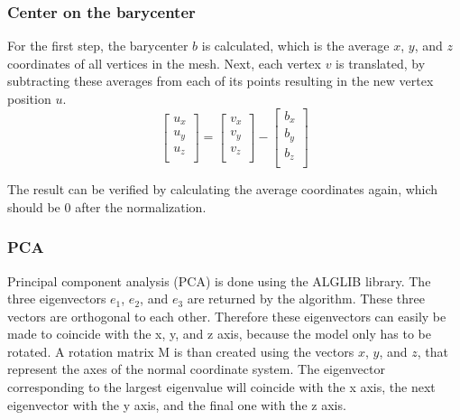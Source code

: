 \documentclass{bigdata}
\begin{document}
\subsubsection{Center on the barycenter}

For the first step, the barycenter $b$ is calculated, which is the average $x$, $y$, and $z$ coordinates of all vertices in the mesh. Next, each vertex $v$ is translated, by subtracting these averages from each of its points resulting in the new vertex position $u$.
\[
\begin{bmatrix}
u_x \\
u_y \\
u_z \\
\end{bmatrix}
=
\begin{bmatrix}
v_x \\
v_y \\
v_z \\
\end{bmatrix}
-
\begin{bmatrix}
b_x \\
b_y \\
b_z \\
\end{bmatrix}
\]


\noindent The result can be verified by calculating the average coordinates again, which should be 0 after the normalization.

\subsubsection{PCA}
Principal component analysis (PCA) is done using the ALGLIB library. The three eigenvectors $e_1$, $e_2$, and $e_3$ are returned by the algorithm. These three vectors are orthogonal to each other. Therefore these eigenvectors can easily be made to coincide with the x, y, and z axis, because the model only has to be rotated. A rotation matrix M is than created using the vectors $x$, $y$, and $z$, that represent the axes of the normal coordinate system. The eigenvector corresponding to the largest eigenvalue will coincide with the x axis, the next eigenvector with the y axis, and the final one with the z axis.
\end{document}
